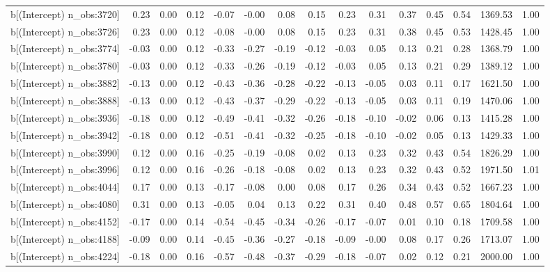 \begin{table}[ht]
\begin{tabular}{rrrrrrrrrrrrrrr}
  b[(Intercept) n\_obs:3720] & 0.23 & 0.00 & 0.12 & -0.07 & -0.00 & 0.08 & 0.15 & 0.23 & 0.31 & 0.37 & 0.45 & 0.54 & 1369.53 & 1.00 \\ 
  b[(Intercept) n\_obs:3726] & 0.23 & 0.00 & 0.12 & -0.08 & -0.00 & 0.08 & 0.15 & 0.23 & 0.31 & 0.38 & 0.45 & 0.53 & 1428.45 & 1.00 \\ 
  b[(Intercept) n\_obs:3774] & -0.03 & 0.00 & 0.12 & -0.33 & -0.27 & -0.19 & -0.12 & -0.03 & 0.05 & 0.13 & 0.21 & 0.28 & 1368.79 & 1.00 \\ 
  b[(Intercept) n\_obs:3780] & -0.03 & 0.00 & 0.12 & -0.33 & -0.26 & -0.19 & -0.12 & -0.03 & 0.05 & 0.13 & 0.21 & 0.29 & 1389.12 & 1.00 \\ 
  b[(Intercept) n\_obs:3882] & -0.13 & 0.00 & 0.12 & -0.43 & -0.36 & -0.28 & -0.22 & -0.13 & -0.05 & 0.03 & 0.11 & 0.17 & 1621.50 & 1.00 \\ 
  b[(Intercept) n\_obs:3888] & -0.13 & 0.00 & 0.12 & -0.43 & -0.37 & -0.29 & -0.22 & -0.13 & -0.05 & 0.03 & 0.11 & 0.19 & 1470.06 & 1.00 \\ 
  b[(Intercept) n\_obs:3936] & -0.18 & 0.00 & 0.12 & -0.49 & -0.41 & -0.32 & -0.26 & -0.18 & -0.10 & -0.02 & 0.06 & 0.13 & 1415.28 & 1.00 \\ 
  b[(Intercept) n\_obs:3942] & -0.18 & 0.00 & 0.12 & -0.51 & -0.41 & -0.32 & -0.25 & -0.18 & -0.10 & -0.02 & 0.05 & 0.13 & 1429.33 & 1.00 \\ 
  b[(Intercept) n\_obs:3990] & 0.12 & 0.00 & 0.16 & -0.25 & -0.19 & -0.08 & 0.02 & 0.13 & 0.23 & 0.32 & 0.43 & 0.54 & 1826.29 & 1.00 \\ 
  b[(Intercept) n\_obs:3996] & 0.12 & 0.00 & 0.16 & -0.26 & -0.18 & -0.08 & 0.02 & 0.13 & 0.23 & 0.32 & 0.43 & 0.52 & 1971.50 & 1.01 \\ 
  b[(Intercept) n\_obs:4044] & 0.17 & 0.00 & 0.13 & -0.17 & -0.08 & 0.00 & 0.08 & 0.17 & 0.26 & 0.34 & 0.43 & 0.52 & 1667.23 & 1.00 \\ 
  b[(Intercept) n\_obs:4080] & 0.31 & 0.00 & 0.13 & -0.05 & 0.04 & 0.13 & 0.22 & 0.31 & 0.40 & 0.48 & 0.57 & 0.65 & 1804.64 & 1.00 \\ 
  b[(Intercept) n\_obs:4152] & -0.17 & 0.00 & 0.14 & -0.54 & -0.45 & -0.34 & -0.26 & -0.17 & -0.07 & 0.01 & 0.10 & 0.18 & 1709.58 & 1.00 \\ 
  b[(Intercept) n\_obs:4188] & -0.09 & 0.00 & 0.14 & -0.45 & -0.36 & -0.27 & -0.18 & -0.09 & -0.00 & 0.08 & 0.17 & 0.26 & 1713.07 & 1.00 \\ 
  b[(Intercept) n\_obs:4224] & -0.18 & 0.00 & 0.16 & -0.57 & -0.48 & -0.37 & -0.29 & -0.18 & -0.07 & 0.02 & 0.12 & 0.21 & 2000.00 & 1.00 \\ 

\end{tabular}
\end{table}
